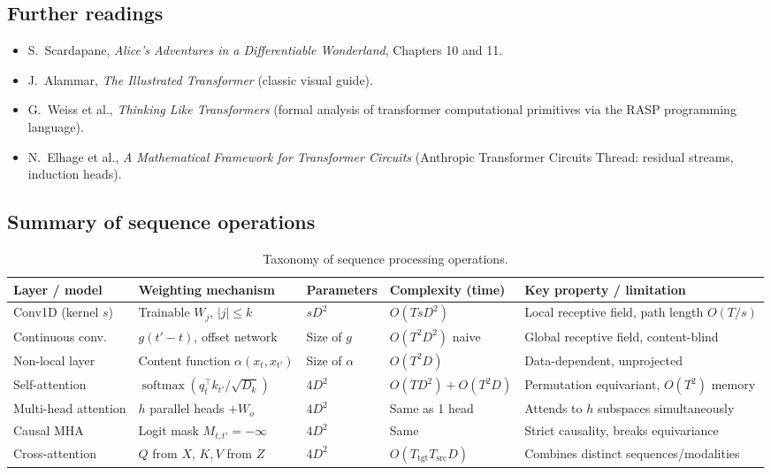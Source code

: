 \documentclass[11pt,a4paper]{article}
\DeclareMathOperator{\softmax}{softmax}
\newcommand{\slides}[1]{\par\nopagebreak\noindent{\normalfont\small\emph{(slides #1)}}\par\nopagebreak\vspace{2pt}}
\theoremstyle{definition}
\theoremstyle{plain}
\begin{document}
\subsection{Further readings}\slides{84 / 84}
\begin{itemize}[nosep]
\item S.\ Scardapane, \emph{Alice's Adventures in a Differentiable Wonderland}, Chapters 10 and 11.
\item J.\ Alammar, \emph{The Illustrated Transformer} (classic visual guide).
\item G.\ Weiss et al., \emph{Thinking Like Transformers} (formal analysis of transformer computational primitives via the RASP programming language).
\item N.\ Elhage et al., \emph{A Mathematical Framework for Transformer Circuits} (Anthropic Transformer Circuits Thread: residual streams, induction heads).
\end{itemize}

\subsection{Summary of sequence operations}
\begin{table}[H]
\centering\scriptsize
\renewcommand{\arraystretch}{1.25}
\begin{tabular}{@{}p{2.6cm}p{3.2cm}p{2.2cm}p{3.0cm}p{3.2cm}@{}}
\toprule
\textbf{Layer / model} & \textbf{Weighting mechanism} & \textbf{Parameters} & \textbf{Complexity (time)} & \textbf{Key property / limitation} \\
\midrule
Conv1D (kernel $s$) & Trainable $W_{j}$, $|j| \le k$ & $s D^2$ & $O(T s D^2)$ & Local receptive field, path length $O(T/s)$ \\
Continuous conv. & $g(t'-t)$, offset network & Size of $g$ & $O(T^2 D^2)$ naive & Global receptive field, content-blind \\
Non-local layer & Content function $\alpha(x_t, x_{t'})$ & Size of $\alpha$ & $O(T^2 D)$ & Data-dependent, unprojected \\
Self-attention & $\softmax(q_t^\top k_{t'} / \sqrt{D_k})$ & $4 D^2$ & $O(T D^2) + O(T^2 D)$ & Permutation equivariant, $O(T^2)$ memory \\
Multi-head attention & $h$ parallel heads $+ W_o$ & $4 D^2$ & Same as 1 head & Attends to $h$ subspaces simultaneously \\
Causal MHA & Logit mask $M_{t, t'} = -\infty$ & $4 D^2$ & Same & Strict causality, breaks equivariance \\
Cross-attention & $Q$ from $X$, $K, V$ from $Z$ & $4 D^2$ & $O(T_{\text{tgt}} T_{\text{src}} D)$ & Combines distinct sequences/modalities \\
\bottomrule
\end{tabular}
\caption{Taxonomy of sequence processing operations.}\label{tab:operations_taxonomy}
\end{table}
\end{document}
